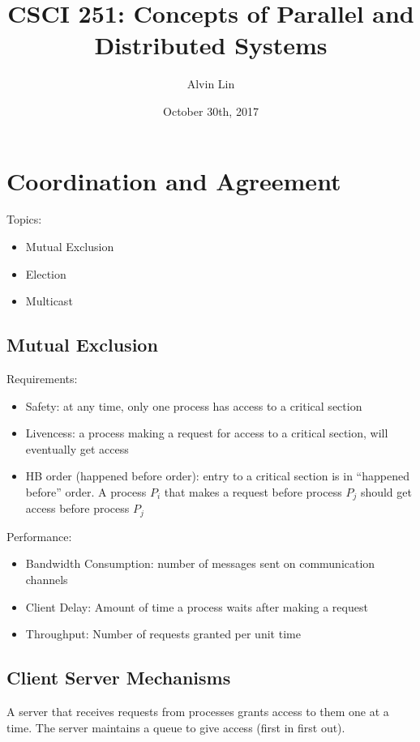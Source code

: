 \documentclass{math}
\title{CSCI 251: Concepts of Parallel and Distributed Systems}
\author{Alvin Lin}
\date{October 30th, 2017}
\begin{document}
\maketitle

\section*{Coordination and Agreement}
Topics:
\begin{itemize}
  \item Mutual Exclusion
  \item Election
  \item Multicast
\end{itemize}

\subsection*{Mutual Exclusion}
Requirements:
\begin{itemize}
  \item Safety: at any time, only one process has access to a critical section
  \item Livencess: a process making a request for access to a critical section,
  will eventually get access
  \item HB order (happened before order): entry to a critical section is in
  ``happened before'' order. A process \( P_i \) that makes a request before
  process \( P_j \) should get access before process \( P_j \)
\end{itemize}
Performance:
\begin{itemize}
  \item Bandwidth Consumption: number of messages sent on communication channels
  \item Client Delay: Amount of time a process waits after making a request
  \item Throughput: Number of requests granted per unit time
\end{itemize}

\subsection*{Client Server Mechanisms}
A server that receives requests from processes grants access to them one at a
time. The server maintains a queue to give access (first in first out).
\end{document}
